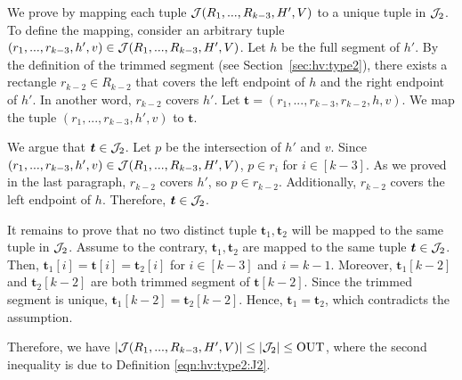 We prove by mapping each tuple $\mathcal{J}(R_1,...,R_{k-3},H',V)$ to a unique tuple in $\mathcal{J}_2$. 
To define the mapping, consider an arbitrary tuple $(r_1,...,r_{k-3}, h', v) \in \mathcal{J}(R_1,...,R_{k-3},H',V)$. Let $h$ be the full segment of $h'$. By the definition of the trimmed segment (see Section~\ref{sec:hv:type2}), there exists a rectangle $r_{k-2}\in R_{k-2}$ that covers the left endpoint of $h$ and the right endpoint of $h'$. In another word, $r_{k-2}$ covers $h'$. Let $\bm{t} = (r_1,...,r_{k-3}, r_{k-2},h,v)$. We map the tuple $(r_1,...,r_{k-3}, h', v)$ to $\bm{t}$. 

\vgap 

We argue that $\textrm{\boldmath${t}$}\in \mathcal{J}_2$. Let $p$ be the intersection of $h'$ and $v$. Since $(r_1,...,r_{k-3}, h', v) \in \mathcal{J}(R_1,...,R_{k-3},H',V)$, $p \in r_i$ for $i \in [k-3]$. As we proved in the last paragraph, $r_{k-2}$ covers $h'$, so $p \in r_{k-2}$. Additionally, $r_{k-2}$ covers the left endpoint of $h$. Therefore, $\textrm{\boldmath${t}$} \in \mathcal{J}_2$.

\vgap

It remains to prove that no two distinct tuple $\bm{t}_1, \bm{t}_2$ will be mapped to the same tuple in $\mathcal{J}_2$. Assume to the contrary, $\bm{t}_1, \bm{t}_2$ are mapped to the same tuple $\textrm{\boldmath${t}$} \in \mathcal{J}_2$. Then, $\bm{t}_1[i] = \bm{t}[i] = \bm{t}_2[i]$ for $i\in [k-3]$ and $i = k-1$. Moreover, $\bm{t}_1[k-2]$ and $\bm{t}_2[k-2]$ are both trimmed segment of $\bm{t}[k-2]$. Since the trimmed segment is unique, $\bm{t}_1[k-2] = \bm{t}_2[k-2]$. Hence, $\bm{t}_1 = \bm{t}_2$, which contradicts the assumption.  

\vgap

Therefore, we have $|\mathcal{J}(R_1,...,R_{k-3},H',V)| \le |\mathcal{J}_2| \le \mathrm{OUT}$, where the second inequality is due to Definition \eqref{eqn:hv:type2:J2}. 